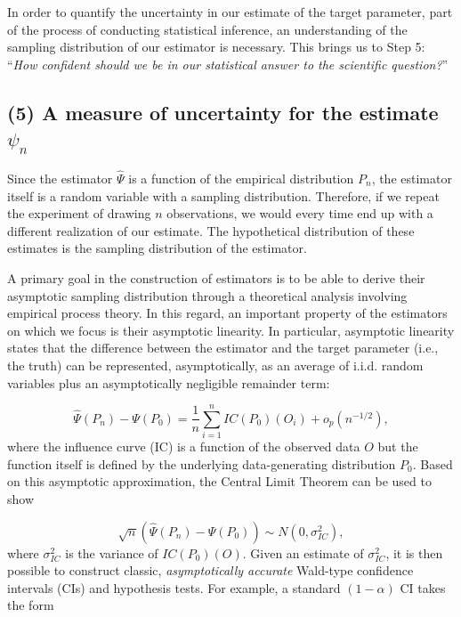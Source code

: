 \documentclass[
  12pt, krantz2,
]{krantz}
\newcommand{\1}{\mathbbm{1}}
\theoremstyle{definition}
\theoremstyle{definition}
\theoremstyle{definition}
\theoremstyle{definition}
\theoremstyle{remark}
\begin{document}
In order to quantify the uncertainty in our estimate of the target parameter,
part of the process of conducting statistical inference, an understanding of the
sampling distribution of our estimator is necessary. This brings us to Step 5:
``\emph{How confident should we be in our statistical answer to the scientific
question?}''

\hypertarget{a-measure-of-uncertainty-for-the-estimate-psi_n}{%
\subsection*{\texorpdfstring{(5) A measure of uncertainty for the estimate \(\psi_n\)}{(5) A measure of uncertainty for the estimate \textbackslash psi\_n}}\label{a-measure-of-uncertainty-for-the-estimate-psi_n}}


Since the estimator \(\hat{\Psi}\) is a function of the empirical distribution
\(P_n\), the estimator itself is a random variable with a sampling distribution.
Therefore, if we repeat the experiment of drawing \(n\) observations, we would
every time end up with a different realization of our estimate. The hypothetical
distribution of these estimates is the sampling distribution of the estimator.

A primary goal in the construction of estimators is to be able to derive their
asymptotic sampling distribution through a theoretical analysis involving
empirical process theory. In this regard, an important property of the
estimators on which we focus is their asymptotic linearity. In particular,
asymptotic linearity states that the difference between the estimator and the
target parameter (i.e., the truth) can be represented, asymptotically, as an
average of i.i.d. random variables plus an asymptotically negligible remainder
term:

\begin{equation*}
  \hat{\Psi}(P_n) - \Psi(P_0) = \frac{1}{n} \sum_{i=1}^n IC(P_0)(O_i) +
    o_p(n^{-1/2}),
\end{equation*}
where the influence curve (IC) is a function of the observed data \(O\) but the
function itself is defined by the underlying data-generating distribution \(P_0\).
Based on this asymptotic approximation, the Central Limit Theorem can be used to
show

\begin{equation*}
  \sqrt{n} \left(\hat{\Psi}(P_n) - \Psi(P_0)\right) \sim N(0, \sigma^2_{IC}),
\end{equation*}
where \(\sigma^2_{IC}\) is the variance of \(IC(P_0)(O)\). Given an estimate of
\(\sigma^2_{IC}\), it is then possible to construct classic, \emph{asymptotically
accurate} Wald-type confidence intervals (CIs) and hypothesis tests. For
example, a standard \((1 - \alpha)\) CI takes the form
\end{document}
